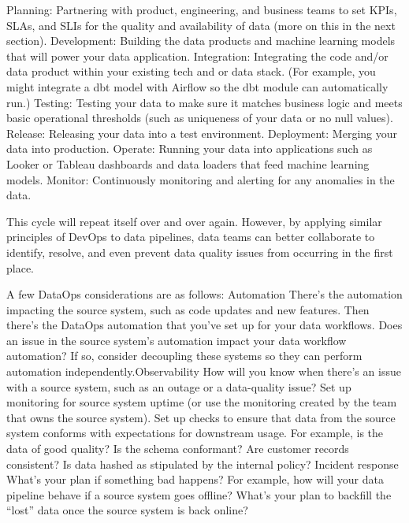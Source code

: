 \documentclass[12pt]{book}
\begin{document}
    Planning: Partnering with product, engineering, and business teams to set KPIs, SLAs, and SLIs for the quality and availability of data (more on this in the next section).
    Development: Building the data products and machine learning models that will power your data application.
    Integration: Integrating the code and/or data product within your existing tech and or data stack. (For example, you might integrate a dbt model with Airflow so the dbt module can automatically run.)
    Testing: Testing your data to make sure it matches business logic and meets basic  operational thresholds (such as uniqueness of your data or no null values).
    Release: Releasing your data into a test environment.
    Deployment: Merging your data into production.
    Operate: Running your data into applications such as Looker or Tableau dashboards and data loaders that feed machine learning models.
    Monitor: Continuously monitoring and alerting for any anomalies in the data.

This cycle will repeat itself over and over again. However, by applying similar principles of DevOps to data pipelines, data teams can better collaborate to identify, resolve, and even prevent data quality issues from occurring in the first place.

A few DataOps considerations are as follows:
Automation
There's the automation impacting the source system, such as code
updates and new features. Then there's the DataOps automation that
you've set up for your data workflows. Does an issue in the source
system's automation impact your data workflow automation? If so,
consider decoupling these systems so they can perform automation
independently.Observability
How will you know when there's an issue with a source system, such as
an outage or a data-quality issue? Set up monitoring for source system
uptime (or use the monitoring created by the team that owns the source
system). Set up checks to ensure that data from the source system
conforms with expectations for downstream usage. For example, is the
data of good quality? Is the schema conformant? Are customer records
consistent? Is data hashed as stipulated by the internal policy?
Incident response
What's your plan if something bad happens? For example, how will
your data pipeline behave if a source system goes offline? What's your
plan to backfill the “lost” data once the source system is back online?
\end{document}
